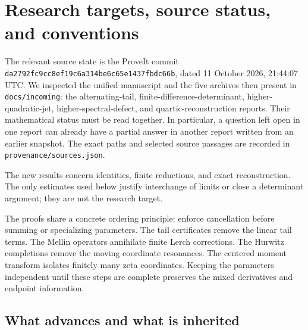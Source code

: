 \documentclass[11pt,letterpaper]{article}
\numberwithin{equation}{section}
\theoremstyle{definition}
\theoremstyle{remark}
\begin{document}
\section{Research targets, source status, and conventions}
\label{sec:scope}

The relevant source state is the ProveIt commit
\texttt{da2792fc9cc8ef19c6a314be6c65e1437fbdc66b}, dated
11 October 2026, 21:44:07 UTC. We inspected the unified manuscript and
the five archives then present in \texttt{docs/incoming}: the alternating-tail,
finite-difference-determinant, higher-quadratic-jet, higher-spectral-defect,
and quartic-reconstruction reports. Their mathematical status must be read
together. In particular, a question left open in one report can already
have a partial answer in another report written from an earlier snapshot.
The exact paths and selected source passages are recorded in
\texttt{provenance/sources.json}.

The new results concern identities, finite reductions, and exact
reconstruction. The only estimates used below justify interchange of
limits or close a determinant argument; they are not the research target.

The proofs share a concrete ordering principle: enforce cancellation
before summing or specializing parameters. The tail certificates remove
the linear tail terms. The Mellin operators annihilate finite Lerch
corrections. The Hurwitz completions remove the moving coordinate
resonances. The centered moment transform isolates finitely many zeta
coordinates. Keeping the parameters independent until these steps are
complete preserves the mixed derivatives and endpoint information.

\subsection{What advances and what is inherited}
\end{document}
